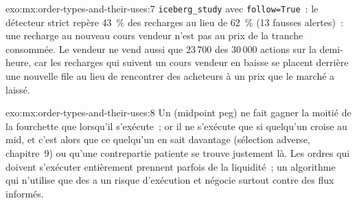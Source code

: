 \begin{solution}{exo:mx:order-types-and-their-uses:7}
\texttt{iceberg\_study} avec \texttt{follow=True}~: le détecteur strict repère 43~\% des recharges au lieu de 62~\% (13 fausses alertes)~: une recharge au nouveau cours vendeur
n'est pas au prix de la tranche consommée. Le vendeur ne vend aussi que 23\,700 des 30\,000 actions sur la demi-heure, car les recharges qui suivent
un cours vendeur en baisse se placent derrière une nouvelle file au lieu de rencontrer des acheteurs à un prix que le marché a laissé.
\end{solution}

\begin{solution}{exo:mx:order-types-and-their-uses:8}
Un  (midpoint peg) ne fait gagner la moitié de la fourchette que lorsqu'il s'exécute~; or il ne s'exécute que si quelqu'un croise au mid, et c'est alors que ce quelqu'un en sait davantage
(sélection adverse, chapitre~9) ou qu'une contrepartie patiente se trouve justement là. Les ordres qui doivent s'exécuter entièrement prennent parfois de la liquidité~; un algorithme qui n'utilise que des 
a un risque d'exécution et négocie surtout contre des flux informés.
\end{solution}

